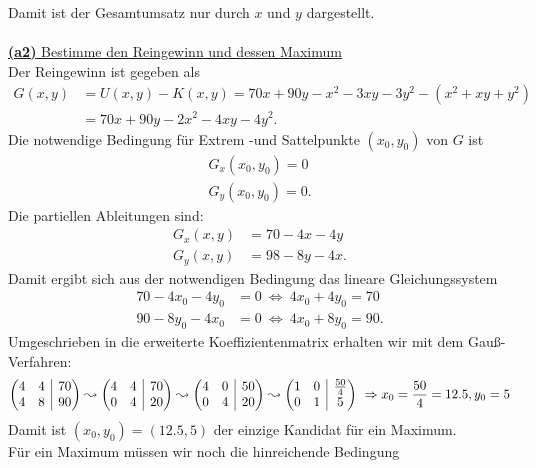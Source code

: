 Damit ist der Gesamtumsatz nur durch $ x $ und $ y $ dargestellt.\\
\\
\underline{\textbf{(a2)} Bestimme den Reingewinn und dessen Maximum}\\
Der Reingewinn ist gegeben als 
\begin{align*}
	G(x,y) &= U(x,y) - K(x,y) = 70x + 90 y- x^2 - 3 xy - 3 y^2 - (x^2 + xy + y^2 )\\
	&=
	70x + 90 y- 2x^2 -4 xy- 4 y^2.
\end{align*}
Die notwendige Bedingung für Extrem -und Sattelpunkte $ (x_0,y_0) $ von $ G $ ist
\begin{align*}
	G_x(x_0,y_0) =0 \\
	G_y(x_0,y_0) =0.
\end{align*}
Die partiellen Ableitungen sind:
\begin{align*}
	G_x(x,y) &= 70 - 4x - 4 y\\
	G_y(x,y) &= 98 -8y -4 x.
\end{align*}
Damit ergibt sich aus der notwendigen Bedingung das lineare Gleichungssystem
\begin{align*}
	70 - 4 x_0 - 4y_0 &= 0 \ \Leftrightarrow \ 4 x_0 + 4 y_0 = 70\\
	90 - 8 y_0 - 4 x_0 &= 0 \ \Leftrightarrow \ 4x_0 + 8y_0 = 90.
\end{align*}
Umgeschrieben in die erweiterte Koeffizientenmatrix erhalten wir mit dem Gauß-Verfahren:
\begin{align*}
	\begin{pmatrix}
		4 & 4 & \BAR &  70\\
		4 & 8 & \BAR & 90
	\end{pmatrix}
	\leadsto
	\begin{pmatrix}
		4 & 4 & \BAR &  70\\
		0 & 4 & \BAR & 20
	\end{pmatrix}
\leadsto
\begin{pmatrix}
	4 & 0 & \BAR &  50\\
	0 & 4 & \BAR & 20
\end{pmatrix}
\leadsto
\begin{pmatrix}
	1 & 0 & \BAR &  \frac{50}{4}\\
	0 & 1 & \BAR & 5
\end{pmatrix} \ \Rightarrow x_0 = \frac{50}{4}  =12.5, y_0 = 5
\end{align*}
Damit ist $ (x_0,y_0 ) = (12.5, 5) $ der einzige Kandidat für ein Maximum.\\
Für ein Maximum müssen wir noch die hinreichende Bedingung 
